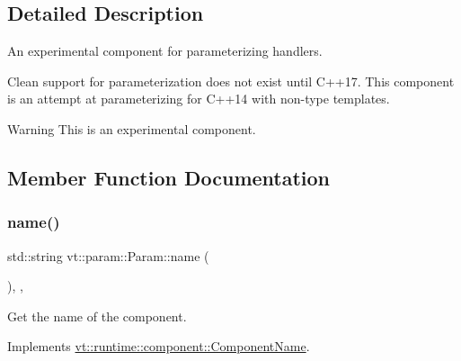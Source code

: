\subsection{Detailed Description}
An experimental component for parameterizing handlers. 

Clean support for parameterization does not exist until C++17. This component is an attempt at parameterizing for C++14 with non-\/type templates.

\begin{DoxyWarning}{Warning}
This is an experimental component. 
\end{DoxyWarning}


\subsection{Member Function Documentation}
\mbox{\label{structvt_1_1param_1_1_param_a848380f8509c11b8bffcf0724af77127}} 
\subsubsection{\texorpdfstring{name()}{name()}}
{\footnotesize\ttfamily std\+::string vt\+::param\+::\+Param\+::name (\begin{DoxyParamCaption}{ }\end{DoxyParamCaption})\hspace{0.3cm}{\ttfamily [inline]}, {\ttfamily [override]}, {\ttfamily [virtual]}}



Get the name of the component. 



Implements \hyperlink{structvt_1_1runtime_1_1component_1_1_component_name_a33c06229bb605a2b2ceff68830d6d773}{vt\+::runtime\+::component\+::\+Component\+Name}.

\mbox{\label{structvt_1_1param_1_1_param_a6b2fedacd76ee622efdb14038b0d82fe}} 

